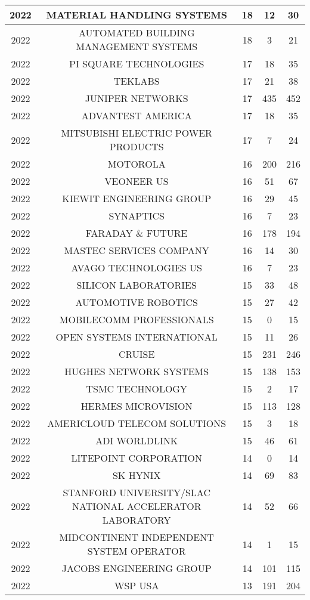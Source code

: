 \documentclass{article}%
\begin{document}
\begin{longtable}{c|c|c|c|c}
\hline%
2022&MATERIAL HANDLING SYSTEMS&18&12&30\\%
\hline%
2022&AUTOMATED BUILDING MANAGEMENT SYSTEMS&18&3&21\\%
\hline%
2022&PI SQUARE TECHNOLOGIES&17&18&35\\%
\hline%
2022&TEKLABS&17&21&38\\%
\hline%
2022&JUNIPER NETWORKS&17&435&452\\%
\hline%
2022&ADVANTEST AMERICA&17&18&35\\%
\hline%
2022&MITSUBISHI ELECTRIC POWER PRODUCTS&17&7&24\\%
\hline%
2022&MOTOROLA&16&200&216\\%
\hline%
2022&VEONEER US&16&51&67\\%
\hline%
2022&KIEWIT ENGINEERING GROUP&16&29&45\\%
\hline%
2022&SYNAPTICS&16&7&23\\%
\hline%
2022&FARADAY \& FUTURE&16&178&194\\%
\hline%
2022&MASTEC SERVICES COMPANY&16&14&30\\%
\hline%
2022&AVAGO TECHNOLOGIES US&16&7&23\\%
\hline%
2022&SILICON LABORATORIES&15&33&48\\%
\hline%
2022&AUTOMOTIVE ROBOTICS&15&27&42\\%
\hline%
2022&MOBILECOMM PROFESSIONALS&15&0&15\\%
\hline%
2022&OPEN SYSTEMS INTERNATIONAL&15&11&26\\%
\hline%
2022&CRUISE&15&231&246\\%
\hline%
2022&HUGHES NETWORK SYSTEMS&15&138&153\\%
\hline%
2022&TSMC TECHNOLOGY&15&2&17\\%
\hline%
2022&HERMES MICROVISION&15&113&128\\%
\hline%
2022&AMERICLOUD TELECOM SOLUTIONS&15&3&18\\%
\hline%
2022&ADI WORLDLINK&15&46&61\\%
\hline%
2022&LITEPOINT CORPORATION&14&0&14\\%
\hline%
2022&SK HYNIX&14&69&83\\%
\hline%
2022&STANFORD UNIVERSITY/SLAC NATIONAL ACCELERATOR LABORATORY&14&52&66\\%
\hline%
2022&MIDCONTINENT INDEPENDENT SYSTEM OPERATOR&14&1&15\\%
\hline%
2022&JACOBS ENGINEERING GROUP&14&101&115\\%
\hline%
2022&WSP USA&13&191&204\\%

\end{longtable}
\end{document}
